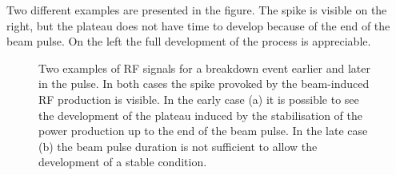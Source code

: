 Two different examples are presented in the figure. The spike is visible on the right, but the plateau does not have time to develop because of the end of the beam pulse. On the left the full development of the process is appreciable.

\begin{figure}[h]
\centering
   \hspace{2mm}
\caption{Two examples of RF signals for a breakdown event earlier and later in the pulse. In both cases the spike provoked by the beam-induced RF production is visible. In the early case (a) it is possible to see the development of the plateau induced by the stabilisation of the power production up to the end of the beam pulse. In the late case (b) the beam pulse duration is not sufficient to allow the development of a stable condition.}
 \label{BI_rf_fig}
 \end{figure}


